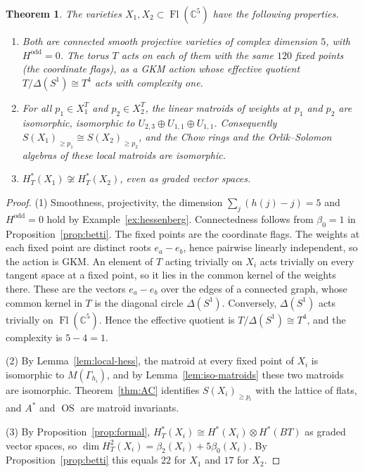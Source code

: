 \documentclass[11pt,a4paper]{article}
\numberwithin{equation}{section}
\theoremstyle{plain}
\newtheorem{theorem}{Theorem}[section]
\theoremstyle{definition}
\theoremstyle{remark}
\newcommand{\C}{\mathbb{C}}
\newcommand{\HT}{H^{*}_{T}}
\DeclareMathOperator{\Fl}{Fl}
\DeclareMathOperator{\OS}{OS}
\begin{document}
\begin{theorem}\label{thm:counterexample}
The varieties $X_1,X_2\subset\Fl(\C^5)$ have the following properties.
\begin{enumerate}[nosep,label=(\arabic*)]
\item Both are connected smooth projective varieties of complex dimension $5$, with $H^{\mathrm{odd}}=0$. The torus $T$ acts on each of them with the same $120$ fixed points (the coordinate flags), as a GKM action whose effective quotient $T/\Delta(S^1)\cong T^4$ acts with complexity one.
\item For all $p_1\in X_1^T$ and $p_2\in X_2^T$, the linear matroids of weights at $p_1$ and $p_2$ are isomorphic, isomorphic to $U_{2,3}\oplus U_{1,1}\oplus U_{1,1}$. Consequently $S(X_1)_{\geqslant p_1}\cong S(X_2)_{\geqslant p_2}$, and the Chow rings and the Orlik--Solomon algebras of these local matroids are isomorphic.
\item $\HT(X_1)\not\cong\HT(X_2)$, even as graded vector spaces.
\end{enumerate}
\end{theorem}
\begin{proof}
(1) Smoothness, projectivity, the dimension $\sum_j(h(j)-j)=5$ and $H^{\mathrm{odd}}=0$ hold by Example~\ref{ex:hessenberg}. Connectedness follows from $\beta_0=1$ in Proposition~\ref{prop:betti}. The fixed points are the coordinate flags. The weights at each fixed point are distinct roots $e_a-e_b$, hence pairwise linearly independent, so the action is GKM. An element of $T$ acting trivially on $X_i$ acts trivially on every tangent space at a fixed point, so it lies in the common kernel of the weights there. These are the vectors $e_a-e_b$ over the edges of a connected graph, whose common kernel in $T$ is the diagonal circle $\Delta(S^1)$. Conversely, $\Delta(S^1)$ acts trivially on $\Fl(\C^5)$. Hence the effective quotient is $T/\Delta(S^1)\cong T^4$, and the complexity is $5-4=1$.

(2) By Lemma~\ref{lem:local-hess}, the matroid at every fixed point of $X_i$ is isomorphic to $M(\Gamma_{h_i})$, and by Lemma~\ref{lem:iso-matroids} these two matroids are isomorphic. Theorem~\ref{thm:AC} identifies $S(X_i)_{\geqslant p_i}$ with the lattice of flats, and $A^*$ and $\OS$ are matroid invariants.

(3) By Proposition~\ref{prop:formal}, $\HT(X_i)\cong H^*(X_i)\otimes H^*(BT)$ as graded vector spaces, so $\dim H^2_T(X_i)=\beta_2(X_i)+5\beta_0(X_i)$. By Proposition~\ref{prop:betti} this equals $22$ for $X_1$ and $17$ for $X_2$.
\end{proof}
\end{document}
